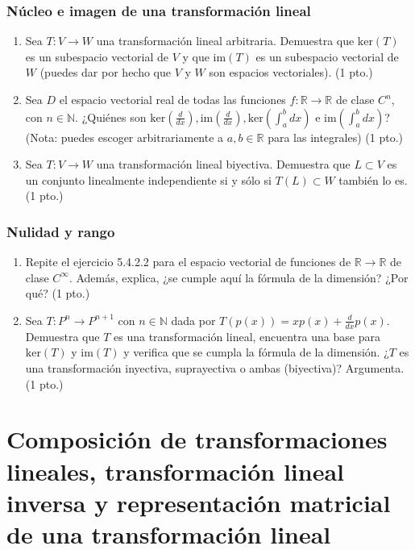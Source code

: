\documentclass[12pt]{article}
\begin{document}
\subsubsection{Núcleo e imagen de una transformación lineal}
\begin{enumerate}
    \item Sea $T:V\to W$ una transformación lineal arbitraria. Demuestra que $\text{ker}(T)$ es un subespacio vectorial de $V$ y que $\text{im}(T)$ es un subespacio vectorial de $W$ (puedes dar por hecho que $V$ y $W$ son espacios vectoriales). (1 pto.)
    \item Sea $D$ el espacio vectorial real de todas las funciones $f:\mathbb{R}\to\mathbb{R}$ de clase $C^n$, con $n\in\mathbb{N}$. ¿Quiénes son $\text{ker}(\frac{d}{dx}), \text{im}(\frac{d}{dx}), \text{ker}(\int_a^b dx)$ e $\text{im}(\int_a^b dx)$? (Nota: puedes escoger arbitrariamente a $a,b\in\mathbb{R}$ para las integrales) (1 pto.)
    \item Sea $T:V\to W$ una transformación lineal biyectiva. Demuestra que $L\subset V$ es un conjunto linealmente independiente si y sólo si $T(L)\subset W$ también lo es. (1 pto.)
\end{enumerate}

\subsubsection{Nulidad y rango}
\begin{enumerate}
    \item Repite el ejercicio 5.4.2.2 para el espacio vectorial de funciones de $\mathbb{R}\to\mathbb{R}$ de clase $C^\infty$. Además, explica, ¿se cumple aquí la fórmula de la dimensión? ¿Por qué? (1 pto.)
    \item Sea $T:P^n\to P^{n+1}$ con $n\in\mathbb{N}$ dada por $T(p(x))=xp(x)+\frac{d}{dx}p(x)$. Demuestra que $T$ es una transformación lineal, encuentra una base para $\text{ker}(T)$ y $\text{im}(T)$ y verifica que se cumpla la fórmula de la dimensión. ¿$T$ es una transformación inyectiva, suprayectiva o ambas (biyectiva)? Argumenta. (1 pto.)
\end{enumerate}

\newpage

\section{Composición de transformaciones lineales, transformación lineal inversa y representación matricial de una transformación lineal}
\end{document}
